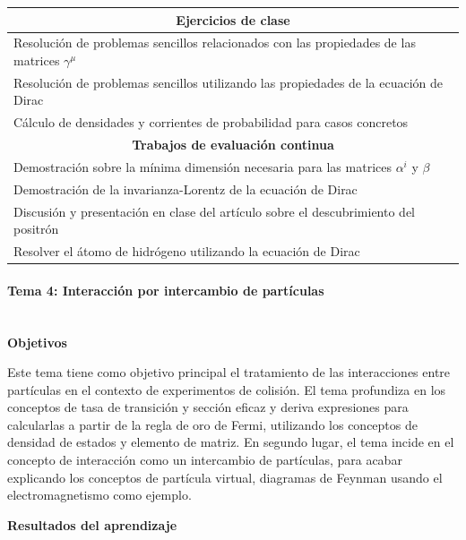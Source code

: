 \begin{center}
\begin{tabularx}{\textwidth}{|X|}
\hline\hline
\multicolumn{1}{|c|}{\textbf{Ejercicios de clase}}\\
\hline\hline
Resolución de problemas sencillos relacionados con las propiedades de las matrices $\gamma^{\mu}$ \\
\hline
Resolución de problemas sencillos utilizando las propiedades de la ecuación de Dirac \\
\hline
Cálculo de densidades y corrientes de probabilidad para casos concretos \\
\hline\hline
\multicolumn{1}{|c|}{\textbf{Trabajos de evaluación continua}}\\
\hline\hline
Demostración sobre la mínima dimensión necesaria para las matrices $\alpha^i$ y $\beta$ \\
\hline
Demostración de la invarianza-Lorentz de la ecuación de Dirac \\
\hline
Discusión y presentación en clase del artículo sobre el descubrimiento del positrón \\
\hline
Resolver el átomo de hidrógeno utilizando la ecuación de Dirac\\
\hline\hline
\end{tabularx}
\end{center}

\paragraph{Tema 4: Interacción por intercambio de partículas\\\\}

\textbf{Objetivos}

Este tema tiene como objetivo principal el tratamiento de las interacciones entre partículas en el contexto de experimentos de colisión. El tema profundiza en los conceptos de tasa de transición y sección eficaz y deriva expresiones para calcularlas a partir de la regla de oro de Fermi, utilizando los conceptos de densidad de estados y elemento de matriz. En segundo lugar, el tema incide en el concepto de interacción como un intercambio de partículas, para acabar explicando los conceptos de partícula virtual, diagramas de Feynman usando el electromagnetismo como ejemplo.

\textbf{Resultados del aprendizaje}

